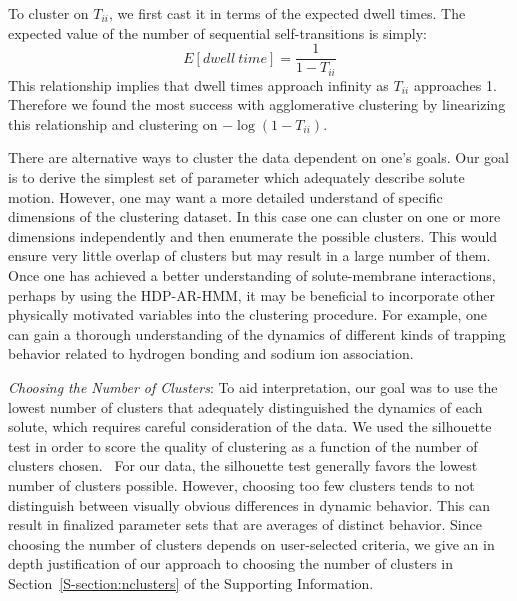 \documentclass[journal=jpcbfk,manuscript=article]{achemso}
\begin{document}
  To cluster on $T_{ii}$, we first cast it in terms of the expected dwell times. The expected
  value of the number of sequential self-transitions is simply:
  \begin{equation}  
   E[dwell~time] = \frac{1}{1 - T_{ii}}
   \label{eqn:dwell_times}
  \end{equation}  
  This relationship implies that dwell times approach infinity as $T_{ii}$ approaches
  1. Therefore we found the most success with agglomerative clustering by linearizing this
  relationship and clustering on $-\log(1 - T_{ii})$.
  
  There are alternative ways to cluster the data dependent on one's goals. Our goal is
  to derive the simplest set of parameter which adequately describe solute motion. 
  However, one may want a more detailed understand of specific dimensions of the 
  clustering dataset. In this case one can cluster on one or more dimensions independently
  and then enumerate the possible clusters. This would ensure very little overlap of
  clusters but may result in a large number of them. Once one has achieved a better 
  understanding of solute-membrane interactions, perhaps by using the HDP-AR-HMM, it may be
  beneficial to incorporate other physically motivated variables into the clustering
  procedure. For example, one can gain a thorough understanding of the dynamics of
  different kinds of trapping behavior related to hydrogen bonding and sodium ion association.

  \textit{Choosing the Number of Clusters}: To aid interpretation, our goal was to
  use the lowest number of clusters that adequately distinguished the dynamics of 
  each solute, which requires careful consideration of the data. We used the silhouette
  test in order to score the quality of clustering as a function of the number of clusters
  chosen.~\cite{kaufman_finding_2009} For our data, the silhouette test generally favors 
  the lowest number of clusters possible. However, choosing too few clusters tends to not
  distinguish between visually obvious differences in dynamic behavior. This can result 
  in finalized parameter sets that are averages of distinct behavior. Since choosing 
  the number of clusters depends on user-selected criteria, we give an in depth 
  justification of our approach to choosing the number of clusters in 
  Section~\ref{S-section:nclusters} of the Supporting Information.  
  
\end{document}
